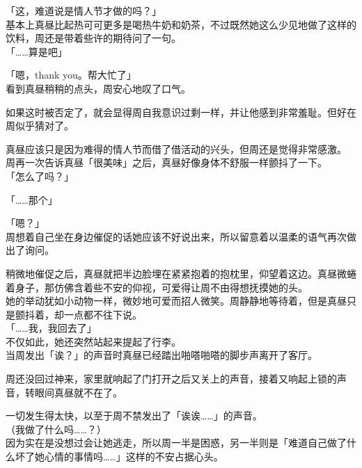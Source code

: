 「这，难道说是情人节才做的吗？」\\

基本上真昼比起热可可更多是喝热牛奶和奶茶，不过既然她这么少见地做了这样的饮料，周还是带着些许的期待问了一句。\\

「……算是吧」

「嗯，thank you。帮大忙了」\\

看到真昼稍稍的点头，周安心地叹了口气。

如果这时被否定了，就会显得周自我意识过剩一样，并让他感到非常羞耻。但好在周似乎猜对了。

真昼应该只是因为难得的情人节而借了借活动的兴头，但周还是觉得非常感激。\\

周再一次告诉真昼「很美味」之后，真昼好像身体不舒服一样颤抖了一下。\\

「怎么了吗？」

「……那个」

「嗯？」\\

周想着自己坐在身边催促的话她应该不好说出来，所以留意着以温柔的语气再次做出了询问。

稍微地催促之后，真昼就把半边脸埋在紧紧抱着的抱枕里，仰望着这边。真昼微蜷着身子，那仿佛含着些不安的仰视，可爱得让周不由得想抚摸她的头。\\

她的举动犹如小动物一样，微妙地可爱而招人微笑。周静静地等待着，但是真昼只是颤抖着，却一点都不往下说。\\

「……我，我回去了」\\

不仅如此，她还突然站起来提起了行李。\\

当周发出「诶？」的声音时真昼已经踏出啪嗒啪嗒的脚步声离开了客厅。

周还没回过神来，家里就响起了门打开之后又关上的声音，接着又响起上锁的声音，转眼间真昼就不在了。

一切发生得太快，以至于周不禁发出了「诶诶……」的声音。\\

（我做了什么吗……？）\\

因为实在是没想过会让她逃走，所以周一半是困惑，另一半则是「难道自己做了什么坏了她心情的事情吗……」这样的不安占据心头。\\

